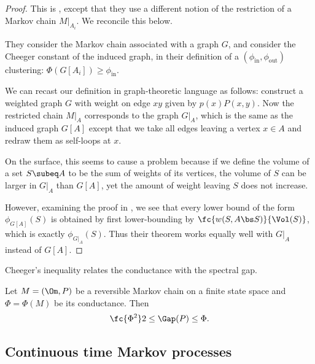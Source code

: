 \begin{proof}
This is \cite[Theorem 1.5]{gharan2014partitioning}, except that they use a different notion of the restriction of a Markov chain $M|_{A_i}$. We reconcile this below.

They consider the Markov chain associated with a graph $G$, and consider the Cheeger constant of the induced graph, in their definition of a $(\phi_{\text{in}},\phi_{\text{out}})$ clustering: $\Phi(G[A_i])\ge \phi_{\text{in}}$.

We can recast our definition in graph-theoretic language as follows: construct a weighted graph $G$ with weight on edge $xy$ given by $p(x)P(x,y)$. Now the restricted chain $M|_{A}$ corresponds to the graph $G|_A$, which is the same as the induced graph $G[A]$ except that we take all edges leaving a vertex $x\in A$ and redraw them as self-loops at $x$.

On the surface, this seems to cause a problem because if we define the volume of a set $S\subeq A$ to be the sum of weights of its vertices, the volume of $S$ can be larger in $G|_A$ than $G[A]$, yet the amount of weight leaving $S$ does not increase.

However, examining the proof in \cite{gharan2014partitioning}, we see that every lower bound of the form $\phi_{G[A]}(S) $ is obtained by first lower-bounding by $\fc{w(S,A\bs S)}{\Vol(S)}$, which is exactly $\phi_{G|_A}(S)$. Thus their theorem works equally well with $G|_A$ instead of $G[A]$.
\end{proof}

Cheeger's inequality relates the conductance with the spectral gap.
\begin{thm}\label{thm:cheeger}
Let $M=(\Om, P)$ be a reversible Markov chain on a finite state space and $\Phi=\Phi(M)$ be its conductance. Then
$$
\fc{\Phi^2}2 \le \Gap(P) \le \Phi.
$$
\end{thm}

\subsection{Continuous time Markov processes}
\label{sec:mdo}

